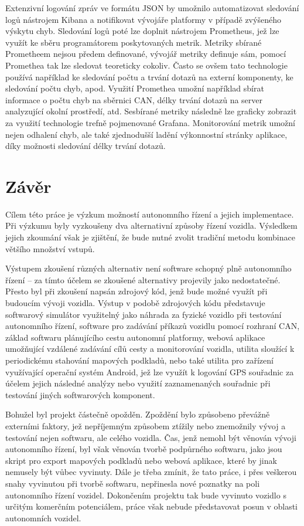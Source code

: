 \documentclass[czech, bachelor]{diploma}
\begin{document}
Extenzivní logování zpráv ve formátu JSON by umožnilo automatizovat sledování logů nástrojem Kibana a notifikovat vývojáře
platformy v případě zvýšeného výskytu chyb. Sledování logů poté lze doplnit nástrojem Prometheus, jež lze využít ke sběru
programátorem poskytovaných metrik. Metriky sbírané Prometheem nejsou předem definované, vývojář metriky definuje sám, pomocí
Promethea tak lze sledovat teoreticky cokoliv. Často se ovšem tato technologie používá například ke sledování počtu a trvání
dotazů na externí komponenty, ke sledování počtu chyb, apod. Využití Promethea umožní například sbírat informace o počtu chyb
na sběrnici CAN, délky trvání dotazů na server analyzující okolní prostředí, atd. Sesbírané metriky následně lze graficky zobrazit
za využití technologie trefně pojmenované Grafana. Monitorování metrik umožní nejen odhalení chyb, ale také zjednodušší ladění
výkonnostní stránky aplikace, díky možnosti sledování délky trvání dotazů.

\chapter{Závěr}

Cílem této práce je výzkum možností autonomního řízení a jejich implementace. Při výzkumu byly vyzkoušeny dva alternativní způsoby
řízení vozidla. Výsledkem jejich zkoumání však je zjištění, že bude nutné zvolit tradiční metodu kombinace většího množství
vstupů.

Výstupem zkoušení různých alternativ není software schopný plně autonomního řízení -- za tímto účelem se zkoušené alternativy
projevily jako nedostatečné. Přesto byl při zkoušení napsán zdrojový kód, jenž bude možné využít při budoucím vývoji vozidla. 
Výstup v podobě zdrojových kódu představuje softwarový simulátor využitelný jako náhrada za fyzické vozidlo při testování 
autonomního řízení, software pro zadávání příkazů vozidlu pomocí rozhraní CAN, základ softwaru plánujícího cestu autonomní 
platformy, webová aplikace umožňující vzdálené zadávání cílů cesty a monitorování vozidla, utilita sloužící k periodickému
stahování mapových podkladů, nebo také utilita pro zařízení využívající operační systém Android, jež lze využít k logování GPS 
souřadnic za účelem jejich následné analýzy nebo využití zaznamenaných souřadnic při testování jiných softwarových komponent.

Bohužel byl projekt částečně opožděn. Zpoždění bylo způsobeno převážně externími faktory, jež nepříjemným způsobem ztížily nebo
znemožnily vývoj a testování nejen softwaru, ale celého vozidla. Čas, jenž nemohl být věnován vývoji autonomního řízení, byl však
věnován tvorbě podpůrného softwaru, jako jsou skript pro export mapových podkladů nebo webová aplikace, které by jinak nemusely
být vůbec vyvinuty. Dále je třeba zmínit, že tato práce, i přes veškerou snahy vyvinutou při tvorbě softwaru, nepřinesla nové
poznatky na poli autonomního řízení vozidel. Dokončením projektu tak bude vyvinuto vozidlo s určitým komerčním potenciálem, práce
však nebude představovat posun v oblasti autonomních vozidel.
\end{document}
